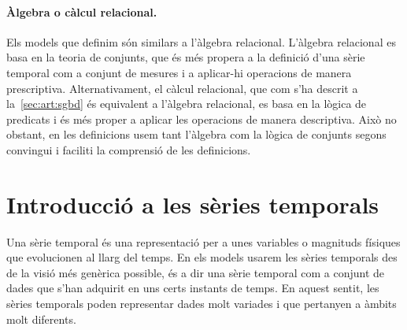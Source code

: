 \paragraph{Àlgebra o càlcul relacional.} Els models que definim són
similars a l'àlgebra relacional. L'àlgebra relacional es basa en la
teoria de conjunts, que és més propera a la definició d'una sèrie
temporal com a conjunt de mesures i a aplicar-hi operacions de manera
prescriptiva. Alternativament, el càlcul relacional, que com s'ha
descrit a la~\autoref{sec:art:sgbd} és equivalent a
l'àlgebra relacional, es basa en la lògica de predicats i és més
proper a aplicar les operacions de manera descriptiva. Això no
obstant, en les definicions usem tant l'àlgebra com la lògica de
conjunts segons convingui i faciliti la comprensió de les definicions.











\section{Introducció a les sèries temporals}


Una sèrie temporal és una representació per a unes variables o
magnituds físiques que evolucionen al llarg del temps.  En els models
usarem les sèries temporals des de la visió més genèrica possible, és
a dir una sèrie temporal com a conjunt de dades que s'han adquirit en
uns certs instants de temps.  En aquest sentit, les sèries temporals
poden representar dades molt variades i que pertanyen a àmbits molt
diferents.


